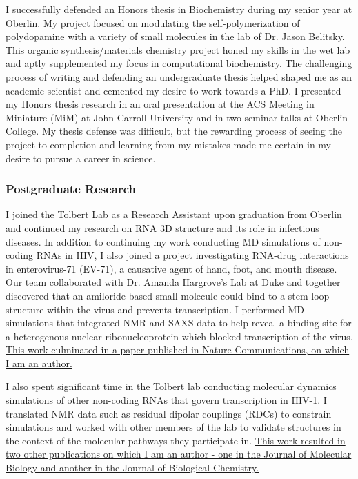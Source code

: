 \documentclass{NIHGrant}
\begin{document}
I successfully defended an Honors thesis in Biochemistry during my senior year at Oberlin. My project focused on modulating the self-polymerization of polydopamine with a variety of small molecules in the lab of Dr. Jason Belitsky. This organic synthesis/materials chemistry project honed my skills in the wet lab and aptly supplemented my focus in computational biochemistry. The challenging process of writing and defending an undergraduate thesis helped shaped me as an academic scientist and cemented my desire to work towards a PhD. I presented my Honors thesis research in an oral presentation at the ACS Meeting in Miniature (MiM) at John Carroll University and in two seminar talks at Oberlin College. My thesis defense was difficult, but the rewarding process of seeing the project to completion and learning from my mistakes made me certain in my desire to pursue a career in science.

\subsubsection*{Postgraduate Research}
I joined the Tolbert Lab as a Research Assistant upon graduation from Oberlin and continued my research on RNA 3D structure and its role in infectious diseases. In addition to continuing my work conducting MD simulations of non-coding RNAs in HIV, I also joined a project investigating RNA-drug interactions in enterovirus-71 (EV-71), a causative agent of hand, foot, and mouth disease. Our team collaborated with Dr. Amanda Hargrove's Lab at Duke and together discovered that an amiloride-based small molecule could bind to a stem-loop structure within the virus and prevents transcription. I performed MD simulations that integrated NMR and SAXS data to help reveal a binding site for a heterogenous nuclear ribonucleoprotein which blocked transcription of the virus. \uline{This work culminated in a paper published in Nature Communications, on which I am an author.}

I also spent significant time in the Tolbert lab conducting molecular dynamics simulations of other non-coding RNAs that govern transcription in HIV-1. I translated NMR data such as residual dipolar couplings (RDCs) to constrain simulations and worked with other members of the lab to validate structures in the context of the molecular pathways they participate in. \uline{This work resulted in two other publications on which I am an author - one in the Journal of Molecular Biology and another in the Journal of Biological Chemistry.}
\end{document}

